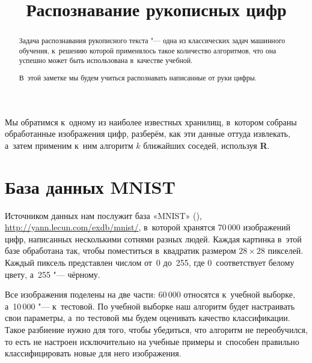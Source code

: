 \documentclass[final,pdftex]{../../template/epsilonj}\usepackage[]{graphicx}\usepackage[]{color}
\begin{document}
	
	\begin{frontmatter}
		\title{Распознавание рукописных цифр}
		
		\begin{aug}
			\author{ }%
			
			
			\address{НИУ ВШЭ, Москва.}
		\end{aug}
		
		\begin{abstract}
		Задача распознавания рукописного текста "--- одна из классических задач машинного обучения, к~решению которой применялось такое количество алгоритмов, что она успешно может быть использована в~качестве учебной. 
		
		В~этой заметке мы будем учиться распознавать написанные от руки цифры.
		\end{abstract}
		
		\begin{keyword}
		\end{keyword}
		
	\end{frontmatter}
	
		
Мы обратимся к~одному из наиболее известных хранилищ, в~котором собраны обработанные изображения цифр, разберём, как эти данные оттуда извлекать, а~затем применим к~ним алгоритм $k$ ближайших соседей, используя \textbf{R}.
	
	\section{База данных MNIST}
	
Источником данных нам послужит база «MNIST» (\cite{mnistdigits}), \url{http://yann.lecun.com/exdb/mnist/}, в~которой хранятся 70\,000 изображений цифр, написанных несколькими сотнями разных людей. 
Каждая картинка в~этой базе обработана так, чтобы поместиться в~квадратик размером $28\times28$ пикселей. 
Каждый пиксель представлен числом от~0 до~255, где 0~соответствует белому цвету, а~255 "--- чёрному. 

Все изображения поделены на две части: 60\,000 относятся к~учебной выборке, а~10\,000 "--- к~тестовой. 
По учебной выборке наш алгоритм будет настраивать свои параметры, а~по тестовой мы будем оценивать качество классификации.
Такое разбиение нужно для того, чтобы убедиться, что алгоритм не переобучился, то есть не настроен исключительно на учебные примеры и~способен правильно классифицировать новые для него изображения.
\end{document}
